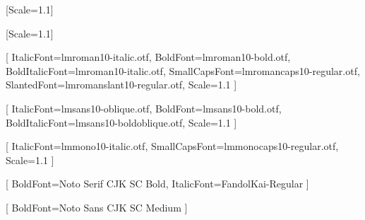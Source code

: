 \newenvironment{englishlyric}{}{}  %








\usepackage{xltxtra,xunicode}

\usepackage{textcomp} %




\newfontfamily{}[Scale=1.1] %

\newfontfamily{}[Scale=1.1]

\setmainfont{lmroman10-regular.otf}[
  ItalicFont=lmroman10-italic.otf,
  BoldFont=lmroman10-bold.otf,
  BoldItalicFont=lmroman10-italic.otf,
  SmallCapsFont=lmromancaps10-regular.otf,
  SlantedFont=lmromanslant10-regular.otf,
  Scale=1.1
]

\setsansfont{lmsans10-regular.otf}[
  ItalicFont=lmsans10-oblique.otf,
  BoldFont=lmsans10-bold.otf,
  BoldItalicFont=lmsans10-boldoblique.otf,
  Scale=1.1
]

\setmonofont{lmmono10-regular.otf}[
  ItalicFont=lmmono10-italic.otf,
  SmallCapsFont=lmmonocaps10-regular.otf,
  Scale=1.1
]

[
  BoldFont=Noto Serif CJK SC Bold,
  ItalicFont=FandolKai-Regular
]

[
  BoldFont=Noto Sans CJK SC Medium
]



\makeatletter
\newcommand*\original@CJKsymbol{}
\newcommand*\original@CJKpunctsymbol{}
\let\original@CJKsymbol\CJKsymbol
\let\original@CJKpunctsymbol\CJKpunctsymbol
\newcommand*\raise@Fandol@CJK[1]{\raise0.08\ccwd\hbox{#1}}
\appto\itshape{%
  \let\CJKsymbol\raise@Fandol@CJK
  \let\CJKpunctsymbol\raise@Fandol@CJK
}
\appto\kaishu{%
  \let\CJKsymbol\raise@Fandol@CJK
  \let\CJKpunctsymbol\raise@Fandol@CJK
}
\appto\fangsong{%
  \let\CJKsymbol\raise@Fandol@CJK
  \let\CJKpunctsymbol\raise@Fandol@CJK
}
\appto\upshape{%
  \let\CJKsymbol\original@CJKsymbol
  \let\CJKpunctsymbol\original@CJKpunctsymbol
}
\makeatother

